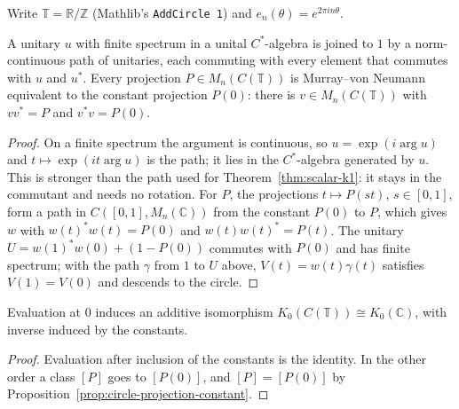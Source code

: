 Write $\mathbb T=\mathbb R/\mathbb Z$ (Mathlib's \texttt{AddCircle 1}) and
$e_n(\theta)=e^{2\pi i n\theta}$.

\begin{proposition}\label{prop:circle-projection-constant}
\leanok
A unitary $u$ with finite spectrum in a unital $C^*$-algebra is joined to $1$
by a norm-continuous path of unitaries, each commuting with every element
that commutes with $u$ and $u^*$. Every projection $P\in M_n(C(\mathbb T))$
is Murray--von Neumann equivalent to the constant projection $P(0)$: there is
$v\in M_n(C(\mathbb T))$ with $vv^*=P$ and $v^*v=P(0)$.
\end{proposition}
\begin{proof}
\leanok
On a finite spectrum the argument is continuous, so $u=\exp(i\arg u)$ and
$t\mapsto\exp(it\arg u)$ is the path; it lies in the $C^*$-algebra generated
by $u$. This is stronger than the path used for
Theorem~\ref{thm:scalar-k1}: it stays in the commutant and needs no
rotation. For $P$, the projections $t\mapsto P(st)$, $s\in[0,1]$, form a path
in $C([0,1],M_n(\mathbb C))$ from the constant $P(0)$ to $P$, which gives
$w$ with $w(t)^*w(t)=P(0)$ and $w(t)w(t)^*=P(t)$. The unitary
$U=w(1)^*w(0)+(1-P(0))$ commutes with $P(0)$ and has finite spectrum; with
the path $\gamma$ from $1$ to $U$ above, $V(t)=w(t)\gamma(t)$ satisfies
$V(1)=V(0)$ and descends to the circle.
\end{proof}

\begin{theorem}\label{thm:circle-k0}
\leanok
Evaluation at $0$ induces an additive isomorphism
$K_0(C(\mathbb T))\cong K_0(\mathbb C)$, with inverse induced by the
constants.
\end{theorem}
\begin{proof}
\leanok
Evaluation after inclusion of the constants is the identity. In the other
order a class $[P]$ goes to $[P(0)]$, and $[P]=[P(0)]$ by
Proposition~\ref{prop:circle-projection-constant}.
\end{proof}

